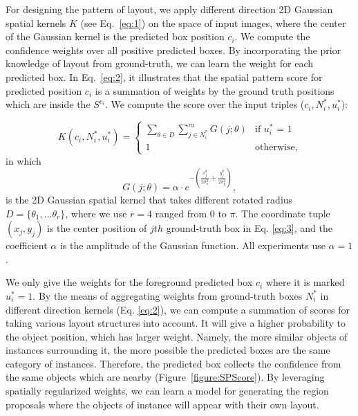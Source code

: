 \documentclass[10pt,twocolumn,letterpaper]{article}
\begin{document}
For designing the pattern of layout, we apply different direction 2D Gaussian spatial kernels $K$ (see Eq.~\ref{eq:1}) on the space of input images, where the center of the Gaussian kernel is the predicted box position $c_{i}$. We compute the confidence weights over all positive predicted boxes. By incorporating the prior knowledge of layout from ground-truth, we can learn the weight for each predicted box. In Eq.~\ref{eq:2}, it illustrates that the spatial pattern score for predicted position $c_{i}$ is a summation of weights by the ground truth positions which are inside the $S^{c_{i}}$. We compute the score over the input triples ($c_{i}, N_{i}^{*}, u_{i}^{*}$):
 	
\begin{equation} \label{eq:2}
K(c_{i}, N_{i}^{*}, u_{i}^{*}) = \begin{cases} \sum_{\theta \in D} \sum_{j \in N_{i}^{*}}^{m} G(j ; \theta) & \mbox{if } u_{i}^{*}\mbox{ = 1} \\ 
1 & \mbox{otherwise,} \end{cases} 
\end{equation}
in which
\begin{equation} \label{eq:3}
G(j ; \theta) = \alpha \cdot e^{-(\frac{x_{j}^{\theta}}{2 \sigma_{x}^{2}}+\frac{y_{j}^{\theta}}{2 \sigma_{y}^{2}})}, 
\end{equation}
is the 2D Gaussian spatial kernel that takes different rotated radius $D = \{\theta_{1},...\theta_{r}\}$, where we use $r = 4$ ranged from 0 to $\pi$. The coordinate tuple $(x_{j}, y_{j})$ is the center position of $jth$ ground-truth box in Eq. \ref{eq:3}, and the coefficient $\alpha$ is the amplitude of the Gaussian function. All experiments use $\alpha = 1$.

We only give the weights for the foreground predicted box $c_{i}$ where it is marked $u_{i}^{*} = 1$. By the means of aggregating weights from ground-truth boxes $N_{i}^{*}$ in different direction kernels (Eq. \ref{eq:2}), we can compute a summation of scores for taking various layout structures into account. It will give a higher probability to the object position, which has larger weight. Namely, the more similar objects of instances surrounding it, the more possible the predicted boxes are the same category of instances. Therefore, the predicted box collects the confidence from the same objects which are nearby (Figure~\ref{figure:SPScore}). By leveraging spatially regularized weights, we can learn a model for generating the region proposals where the objects of instance will appear with their own layout.
\end{document}
